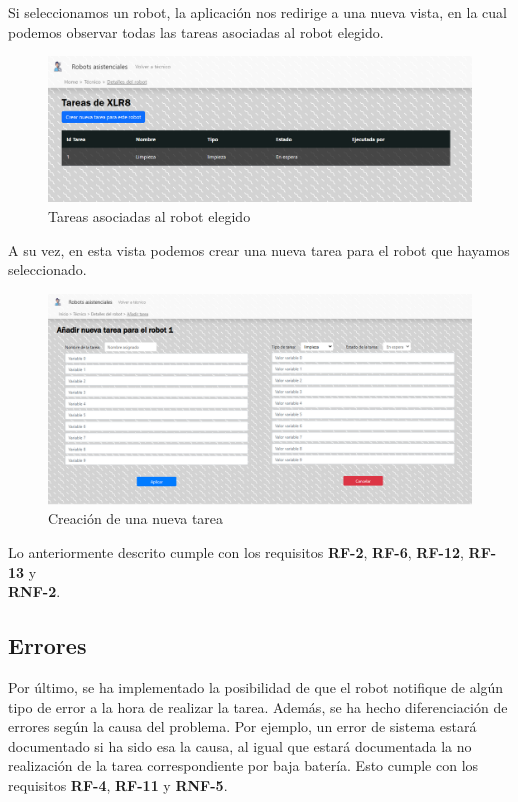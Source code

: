 Si seleccionamos un robot, la aplicación nos redirige a una nueva vista, en la cual podemos observar todas las tareas asociadas al robot elegido.
\begin{figure}[H]
	\centering
	\includegraphics[width=1\textwidth]{images/CrearTareas.png}
	\caption{Tareas asociadas al robot elegido}
	\label{fig:UMLModel}
\end{figure}

A su vez, en esta vista podemos crear una nueva tarea para el robot que hayamos seleccionado. 
\begin{figure}[H]
	\centering
	\includegraphics[width=1\textwidth]{images/TaskCreator.png}
	\caption{Creación de una nueva tarea}
	\label{fig:UMLModel}
\end{figure}


Lo anteriormente descrito cumple con los requisitos \textbf{RF-2}, \textbf{RF-6}, \textbf{RF-12}, \textbf{RF-13} y \\ 
\textbf{RNF-2}.

\subsection{Errores}

Por último, se ha implementado la posibilidad de que el robot notifique de algún tipo de error a la hora de realizar la tarea. Además, se ha hecho diferenciación de errores según la causa del problema. Por ejemplo, un error de sistema estará documentado si ha sido esa la causa, al igual que estará documentada la no realización de la tarea correspondiente por baja batería. Esto cumple con los requisitos \textbf{RF-4}, \textbf{RF-11} y \textbf{RNF-5}.

